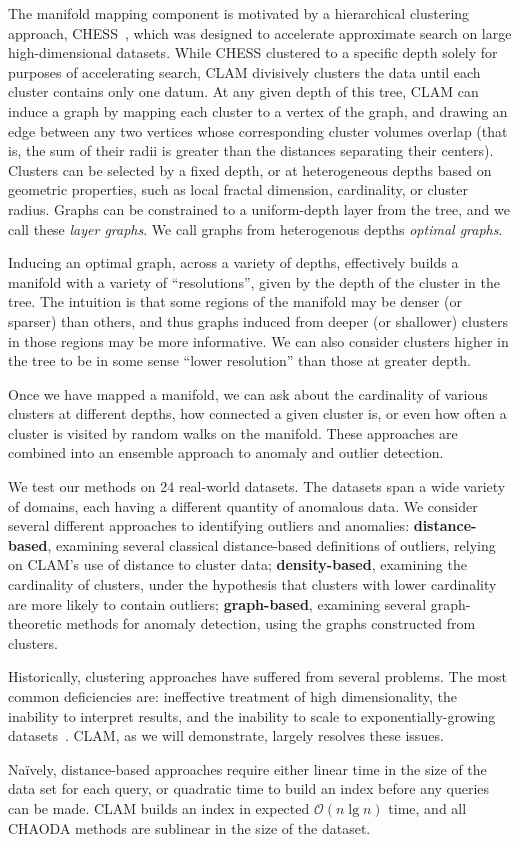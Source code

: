 The manifold mapping component is motivated by a hierarchical clustering approach, CHESS~\cite{ishaq2019clustered}, which was designed to accelerate approximate search on large high-dimensional datasets.
While CHESS clustered to a specific depth solely for purposes of accelerating search, CLAM
divisively clusters the data until each cluster contains only one datum.
At any given depth of this tree, CLAM can induce a graph by mapping each cluster to a vertex of the graph, and drawing an edge between any two vertices whose corresponding cluster volumes overlap (that is, the sum of their radii is greater than the distances separating their centers).
Clusters can be selected by a fixed depth, or at heterogeneous depths based on geometric properties, such as local fractal dimension, cardinality, or cluster radius.
Graphs can be constrained to a uniform-depth layer from the tree, and we call these \textit{layer graphs}.
We call graphs from heterogenous depths \textit{optimal graphs}.

Inducing an optimal graph, across a variety of depths, effectively builds a manifold with a variety of ``resolutions'', given by the depth of the cluster in the tree. The intuition is that some regions of the manifold may be denser (or sparser) than others, and thus graphs induced from deeper (or shallower) clusters in those regions may be more informative.
We can also consider clusters higher in the tree to be in some sense ``lower resolution'' than those at greater depth.

Once we have mapped a manifold, we can ask about the cardinality of various clusters at different depths, how connected a given cluster is, or even how often a cluster is visited by random walks on the manifold.
These approaches are combined into an ensemble approach to anomaly and outlier detection.

We test our methods on 24 real-world datasets.
The datasets span a wide variety of domains, each having a different quantity of anomalous data.
We consider several different approaches to identifying outliers and anomalies:
\textbf{distance-based}, examining several classical distance-based definitions of outliers, relying on CLAM's use of distance to cluster data;
\textbf{density-based}, examining the cardinality of clusters, under the hypothesis that clusters with lower cardinality are more likely to contain outliers;
\textbf{graph-based}, examining several graph-theoretic methods for anomaly detection, using the graphs constructed from clusters.

Historically, clustering approaches have suffered from several problems.
The most common deficiencies are: ineffective treatment of high dimensionality, the inability to interpret results, and the inability to scale to exponentially-growing datasets~\cite{agrawal1998automatic}.
CLAM, as we will demonstrate, largely resolves these issues.

Na\"ively, distance-based approaches require either linear time in the size of the data set for each query,
or quadratic time to build an index before any queries can be made.
CLAM builds an index in expected $\mathcal{O}(n \lg n)$ time, and all CHAODA methods are sublinear in the size of the dataset.
